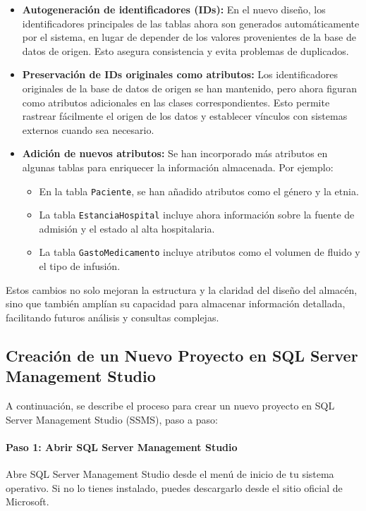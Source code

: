 \documentclass{article}
\begin{document}
	\begin{itemize}
		\item \textbf{Autogeneración de identificadores (IDs):} En el nuevo diseño, los identificadores principales de las tablas ahora son generados automáticamente por el sistema, en lugar de depender de los valores provenientes de la base de datos de origen. Esto asegura consistencia y evita problemas de duplicados.
		
		\item \textbf{Preservación de IDs originales como atributos:} Los identificadores originales de la base de datos de origen se han mantenido, pero ahora figuran como atributos adicionales en las clases correspondientes. Esto permite rastrear fácilmente el origen de los datos y establecer vínculos con sistemas externos cuando sea necesario.
		
		\item \textbf{Adición de nuevos atributos:} Se han incorporado más atributos en algunas tablas para enriquecer la información almacenada. Por ejemplo:
		\begin{itemize}
			\item En la tabla \texttt{Paciente}, se han añadido atributos como el género y la etnia.
			\item La tabla \texttt{EstanciaHospital} incluye ahora información sobre la fuente de admisión y el estado al alta hospitalaria.
			\item La tabla \texttt{GastoMedicamento} incluye atributos como el volumen de fluido y el tipo de infusión.
		\end{itemize}
	\end{itemize}
	
	Estos cambios no solo mejoran la estructura y la claridad del diseño del almacén, sino que también amplían su capacidad para almacenar información detallada, facilitando futuros análisis y consultas complejas.
	
	
	\subsection{Creación de un Nuevo Proyecto en SQL Server Management Studio}
	
	A continuación, se describe el proceso para crear un nuevo proyecto en SQL Server Management Studio (SSMS), paso a paso:
	
	\paragraph{Paso 1: Abrir SQL Server Management Studio}  
	Abre SQL Server Management Studio desde el menú de inicio de tu sistema operativo. Si no lo tienes instalado, puedes descargarlo desde el sitio oficial de Microsoft.
	
\end{document}
